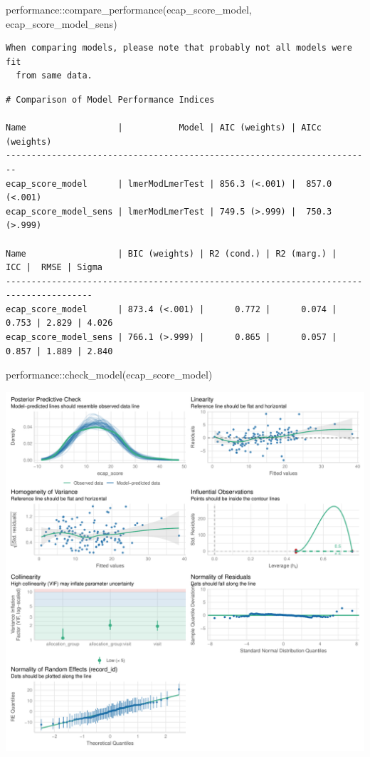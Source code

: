 \documentclass[
  letterpaper,
  DIV=11,
  numbers=noendperiod]{scrartcl}
\newenvironment{Shaded}{\begin{snugshade}}{\end{snugshade}}
\newcommand{\FunctionTok}[1]{\textcolor[rgb]{0.28,0.35,0.67}{#1}}
\newcommand{\NormalTok}[1]{\textcolor[rgb]{0.00,0.23,0.31}{#1}}
\newcommand{\SpecialCharTok}[1]{\textcolor[rgb]{0.37,0.37,0.37}{#1}}
\begin{document}
\begin{Shaded}
\begin{Highlighting}[]
\NormalTok{performance}\SpecialCharTok{::}\FunctionTok{compare\_performance}\NormalTok{(ecap\_score\_model, ecap\_score\_model\_sens)}
\end{Highlighting}
\end{Shaded}

\begin{verbatim}
When comparing models, please note that probably not all models were fit
  from same data.
\end{verbatim}

\begin{verbatim}
# Comparison of Model Performance Indices

Name                  |           Model | AIC (weights) | AICc (weights)
------------------------------------------------------------------------
ecap_score_model      | lmerModLmerTest | 856.3 (<.001) |  857.0 (<.001)
ecap_score_model_sens | lmerModLmerTest | 749.5 (>.999) |  750.3 (>.999)

Name                  | BIC (weights) | R2 (cond.) | R2 (marg.) |   ICC |  RMSE | Sigma
---------------------------------------------------------------------------------------
ecap_score_model      | 873.4 (<.001) |      0.772 |      0.074 | 0.753 | 2.829 | 4.026
ecap_score_model_sens | 766.1 (>.999) |      0.865 |      0.057 | 0.857 | 1.889 | 2.840
\end{verbatim}

\begin{Shaded}
\begin{Highlighting}[]
\NormalTok{performance}\SpecialCharTok{::}\FunctionTok{check\_model}\NormalTok{(ecap\_score\_model)}
\end{Highlighting}
\end{Shaded}

\includegraphics{Outcomes_V1V2V3_files/figure-pdf/ecap_score_4-1.pdf}
\end{document}
